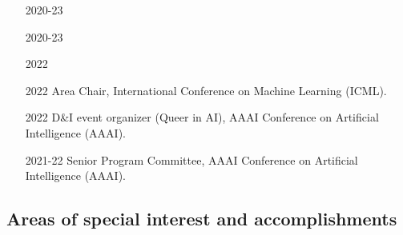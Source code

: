 \documentclass[10pt]{article}
\begin{document}
\begin{itemize}[leftmargin=5em]
  \item[2020-23] 
  \item[2020-23] 
  \item[2022] 
  \item[2022] {Area Chair, International Conference on Machine Learning (ICML).}
  \item[2022] {D\&I event organizer (Queer in AI), AAAI Conference on Artificial Intelligence (AAAI).}
  \item[2021-22] {Senior Program Committee, AAAI Conference on Artificial Intelligence (AAAI).}
\end{itemize}









\subsection{Areas of special interest and accomplishments}

\end{document}
